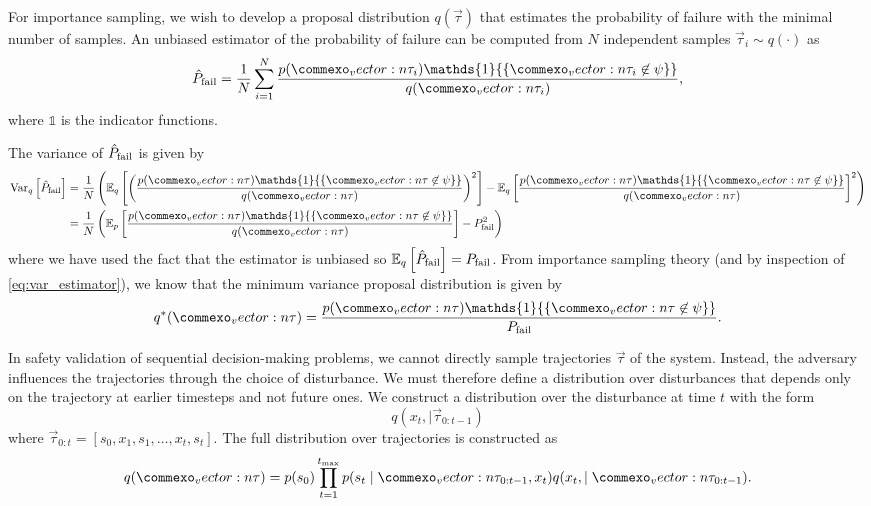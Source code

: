 For importance sampling, we wish to develop a proposal distribution $q(\vec{\tau})$ that estimates the probability of failure with the minimal number of samples. An unbiased estimator of the probability of failure can be computed from $N$ independent samples $\vec{\tau}_i \sim q(\cdot)$ as
\begin{equation}
\hat{P}_{\rm fail} = \frac{1}{N} \sum_{i=1}^N \frac{p(\vec{\tau}_i) \mathds{1}{\{ \vec{\tau}_i \not \in \psi \}}}{q(\vec{\tau}_i)} \text{,} \label{eq:pfail_estimator}
\end{equation}
where $\mathds{1}$ is the indicator functions. 

The variance of $\hat{P}_{\rm fail}$ is given by
\begin{align}
\text{Var}_q\left[ \hat{P}_{\rm fail} \right] &= \frac{1}{N} \left( \mathbb{E}_q \left[\left(\frac{p(\vec{\tau}) \mathds{1}{\{ \vec{\tau} \not \in \psi \}}}{q(\vec{\tau})} \right)^2 \right] - \mathbb{E}_q\left[ \frac{p(\vec{\tau}) \mathds{1}{\{ \vec{\tau} \not \in \psi \}}}{q(\vec{\tau})}  \right]^2 \right) \label{eq:var_estimator}\\
&= \frac{1}{N} \left(\mathbb{E}_p \left[\frac{p(\vec{\tau}) \mathds{1}{\{ \vec{\tau} \not \in \psi \}}}{q(\vec{\tau})} \right] - P_{\rm fail}^2 \right)\label{eq:pfail_variance}
\end{align}
where we have used the fact that the estimator is unbiased so $\mathbb{E}_q\left[ \hat{P}_{\rm fail}  \right] = P_{\rm fail}$. From importance sampling theory (and by inspection of \cref{eq:var_estimator}), we know that the minimum variance proposal distribution is given by 
\begin{equation}
    q^*(\vec{\tau}) = \frac{p(\vec{\tau}) \mathds{1}{\{ \vec{\tau} \not \in \psi \}}}{P_{\rm fail}} \text{.}
\end{equation}

In safety validation of sequential decision-making problems, we cannot directly sample trajectories $\vec{\tau}$ of the system. Instead, the adversary influences the trajectories through the choice of disturbance. We must therefore define a distribution over disturbances that depends only on the trajectory at earlier timesteps and not future ones. We construct a distribution over the disturbance at time $t$ with the form
\begin{equation}
    q(x_t, \mid \vec{\tau}_{0:t-1})
\end{equation}
where $\vec{\tau}_{0:t} = [s_0, x_1, s_1, \ldots, x_t, s_t]$. The full distribution over trajectories is constructed as
\begin{equation}
    q(\vec{\tau}) = p(s_0) \prod_{t = 1}^{t_{\rm max}} p(s_t \mid \vec{\tau}_{0:t-1}, x_t) q(x_t, \mid \vec{\tau}_{0:t-1}) \text{.} \label{eq:induced_distribution}
\end{equation}

